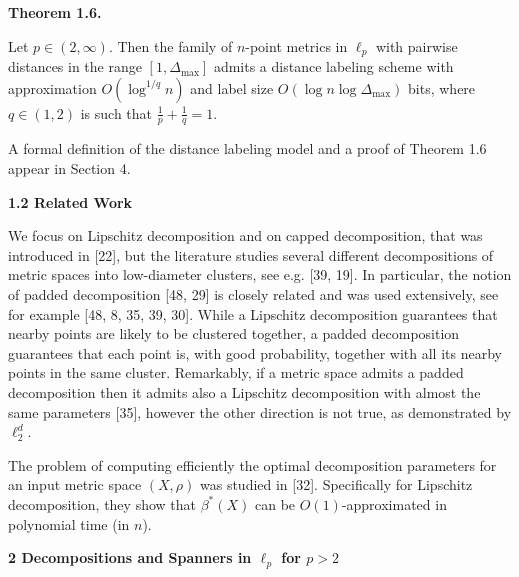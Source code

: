 \documentclass[10pt,a4paper]{amsart}
\begin{document}
\par
\par
\par\medskip\noindent\textbf{Theorem 1.6.}\par
Let $p\in(2,\infty)$. Then the family of $n$-point metrics in $\ell_{p}$ with pairwise distances in the range $[1,\Delta_{\text{max}}]$ admits a distance labeling scheme with approximation $O(\log^{1/q}{n})$ and label size $O(\log{n}\log{\Delta_{\text{max}}})$ bits, where $q\in(1,2)$ is such that $\frac{1}{p}+\frac{1}{q}=1$.
\par
\par
\par
A formal definition of the distance labeling model and a proof of Theorem 1.6 appear in Section 4.
\par
\par
\par
\par
\par\medskip\noindent\textbf{1.2 Related Work}\par
We focus on Lipschitz decomposition and on capped decomposition, that was introduced in [22], but the literature studies several different decompositions of metric spaces into low-diameter clusters, see e.g. [39, 19]. In particular, the notion of padded decomposition [48, 29] is closely related and was used extensively, see for example [48, 8, 35, 39, 30]. While a Lipschitz decomposition guarantees that nearby points are likely to be clustered together, a padded decomposition guarantees that each point is, with good probability, together with all its nearby points in the same cluster. Remarkably, if a metric space admits a padded decomposition then it admits also a Lipschitz decomposition with almost the same parameters [35], however the other direction is not true, as demonstrated by $\ell_{2}^{d}$.
\par
\par
The problem of computing efficiently the optimal decomposition parameters for an input metric space $(X,\rho)$ was studied in [32]. Specifically for Lipschitz decomposition, they show that $\beta^{*}(X)$ can be $O(1)$-approximated in polynomial time (in $n$).
\par
\par
\par
\par\medskip\noindent\textbf{2 Decompositions and Spanners in $\ell_{p}$ for $p>2$}\par
\end{document}
